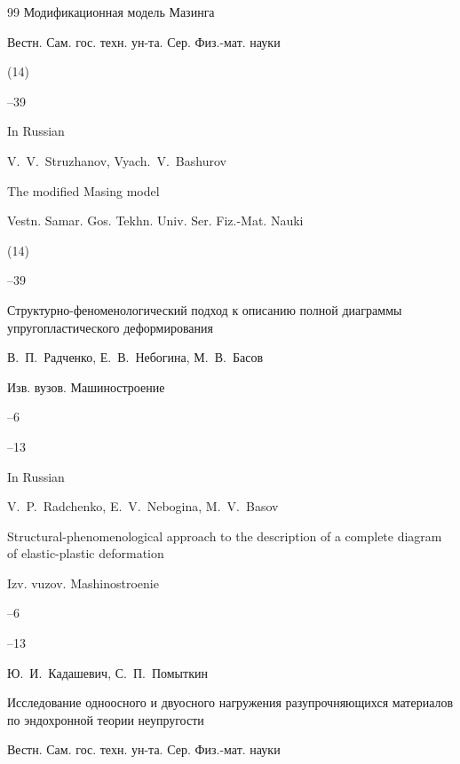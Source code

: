\begin{thebibliography}{99}
\paper Модификационная модель Мазинга

\jour Вестн. Сам. гос. техн. ун-та. Сер. Физ.-мат. науки


(14)

--39



\misctransl

\lang In Russian

\by V.~V.~Struzhanov, Vyach.~V.~Bashurov

\paper The modified Masing model

\jour Vestn. Samar. Gos. Tekhn. Univ. Ser. Fiz.-Mat. Nauki


(14)

--39




\paper Структурно-феноменологический подход к описанию полной диаграммы упругопластического деформирования

\by В.~П.~Радченко, Е.~В.~Небогина, М.~В.~Басов

\jour Изв. вузов. Машиностроение


--6

--13

\misctransl 

\lang In Russian

\by  V.~P.~Radchenko, E.~V.~Nebogina, M.~V.~Basov

\paper Structural-phenomenological approach to the description of a complete diagram of elastic-plastic deformation

\jour Izv. vuzov. Mashinostroenie

--6


--13






\by Ю.~И.~Кадашевич, С.~П.~Помыткин

\paper Исследование одноосного и двуосного нагружения разупрочняющихся материалов по эндохронной теории неупругости

\jour Вестн. Сам. гос. техн. ун-та. Сер. Физ.-мат. науки


\end{thebibliography}
